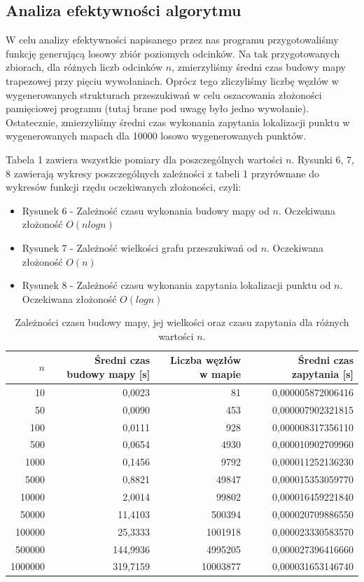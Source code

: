 \documentclass[11pt,a4paper]{article}
\begin{document}
\subsection{Analiza efektywności algorytmu}
W celu analizy efektywności napisanego przez nas programu
przygotowaliśmy funkcję generującą losowy zbiór 
poziomych odcinków. Na tak przygotowanych zbiorach,
dla różnych liczb odcinków $n$, zmierzyliśmy średni
czas budowy mapy trapezowej przy pięciu wywołaniach.
Oprócz tego zliczyliśmy liczbę węzłów w wygenerowanych
strukturach przeszukiwań w celu oszacowania złożoności
pamięciowej programu (tutaj brane pod uwagę było jedno wywołanie). 
Ostatecznie, zmierzyliśmy średni czas
wykonania zapytania lokalizacji punktu w wygenerowanych
mapach dla 10000 losowo wygenerowanych punktów.

Tabela 1 zawiera wszystkie pomiary dla poszczególnych
wartości $n$. Rysunki 6, 7, 8 zawierają wykresy
poszczególnych zależności z tabeli 1 przyrównane do wykresów
funkcji rzędu oczekiwanych złożoności, czyli:
\begin{itemize}
    \item Rysunek 6 
    - Zależność czasu wykonania budowy mapy od $n$. 
    Oczekiwana złożoność $O(nlogn)$
    \item Rysunek 7
    - Zależność wielkości grafu przeszukiwań od $n$. 
    Oczekiwana złożoność $O(n)$
    \item Rysunek 8 
    - Zależność czasu wykonania zapytania lokalizacji punktu od $n$. 
    Oczekiwana złożoność $O(logn)$
\end{itemize}

\begin{table}[H]
    \centering
    \begin{tabular}{|r|r|r|r|}
    \hline
        $n$ & Średni czas budowy mapy [\si{s}] & Liczba węzłów w mapie & Średni czas zapytania [\si{s}]\\ \hline
        10 & 0,0023 & 81 & 0,000005872006416 \\ \hline
        50 & 0,0090 & 453 & 0,000007902321815 \\ \hline
        100 & 0,0111 & 928 & 0,000008317356110 \\ \hline
        500 & 0,0654 & 4930 & 0,000010902709960 \\ \hline
        1000 & 0,1456 & 9792 & 0,000011252136230 \\ \hline
        5000 & 0,8821 & 49847 & 0,000015353059770 \\ \hline
        10000 & 2,0014 & 99802 & 0,000016459221840 \\ \hline
        50000 & 11,4103 & 500394 & 0,000020709886550 \\ \hline
        100000 & 25,3333 & 1001918 & 0,000023330583570 \\ \hline
        500000 & 144,9936 & 4995205 & 0,000027396416660 \\ \hline
        1000000 & 319,7159 & 10003877 & 0,000031653146740 \\ \hline
    \end{tabular}
    \caption{Zależności czasu budowy mapy, jej wielkości 
    oraz czasu zapytania dla różnych wartości $n$.}
\end{table}
\end{document}
